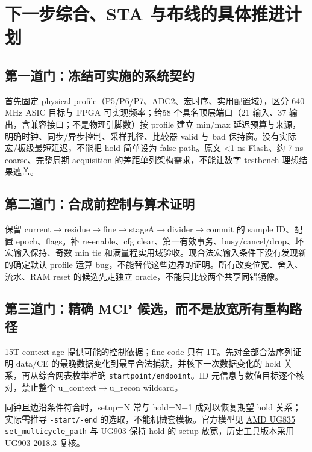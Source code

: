 \documentclass[UTF8,fontset=fandol,10pt,a4paper,openany]{ctexrep}
\newcommand{\code}[1]{\nolinkurl{#1}}
\begin{document}
\section{下一步综合、STA 与布线的具体推进计划}


\subsection{第一道门：冻结可实施的系统契约}


首先固定 physical profile（P5/P6/P7、ADC2、宏时序、实用配置域），区分 640 MHz ASIC 目标与 FPGA 可实现频率；给58 个具名顶层端口（21 输入、37 输出，含兼容接口；不是物理引脚数）按 profile 建立 min/max 延迟预算与来源，明确时钟、同步/异步控制、采样孔径、比较器 valid 与 bad 保持窗。没有实际宏/板级最短延迟，不能把 hold 简单设为 false path。原文 <1 ns Flash、约 7 ns coarse、完整周期 acquisition 的差距单列架构需求，不能让数字 testbench 理想结果遮盖。


\subsection{第二道门：合成前控制与算术证明}


保留 current\ensuremath{\rightarrow}residue\ensuremath{\rightarrow}fine\ensuremath{\rightarrow}stageA\ensuremath{\rightarrow}divider\ensuremath{\rightarrow}commit 的 sample ID、配置 epoch、flags。补 re-enable、cfg clear、第一有效事务、busy/cancel/drop、坏宏输入保持、奇数 min tie 和满量程实用域验收。现合法宏输入条件下没有发现新的确定默认 profile 运算 bug，不能替代这些边界的证明。所有改变位宽、舍入、流水、RAM reset 的候选先走独立 oracle，不能只比较两个共享同错镜像。


\subsection{第三道门：精确 MCP 候选，而不是放宽所有重构路径}


15T context-age 提供可能的控制依据；fine code 只有 1T。先对全部合法序列证明 data/CE 的最晚数据变化到最早合法捕获，并核下一次数据变化的 hold 关系，再从综合网表枚举准确 \code{startpoint/endpoint}。ID 元信息与数值目标逐个核对，禁止整个 u\_context\ensuremath{\rightarrow}u\_recon wildcard。


同钟且边沿条件符合时，setup=N 常与 hold=N\ensuremath{-}1 成对以恢复期望 hold 关系；实际需推导 \code{-start/-end} 的选取，不能机械套模板。官方模型见 \href{https://docs.amd.com/r/en-US/ug835-vivado-tcl-commands/set_multicycle_path}{AMD UG835 \code{set_multicycle_path}} 与 \href{https://docs.amd.com/r/2023.1-English/ug903-vivado-using-constraints/Relaxing-Setup-While-Maintaining-Hold}{UG903 保持 hold 的 setup 放宽}，历史工具版本采用 \href{https://docs.amd.com/v/u/2018.3-English/ug903-vivado-using-constraints}{UG903 2018.3} 复核。
\end{document}
